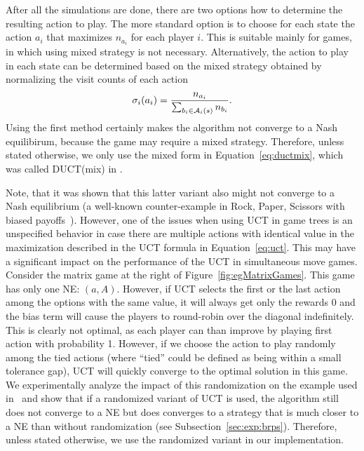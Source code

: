 After all the simulations are done, there are two options how to determine the resulting action to play.
The more standard option is to choose for each state the action $a_i$ that maximizes $n_{a_i}$ for each player $i$.
This is suitable mainly for games, in which using mixed strategy is not necessary.
Alternatively, the action to play in each state can be determined based on the mixed strategy obtained by normalizing the visit counts of each action
\begin{equation}
\sigma_i(a_i) = \frac{n_{a_i}}{\sum_{b_i\in \mathcal{A}_i(s)} n_{b_i}}.
\label{eq:ductmix}
\end{equation}
Using the first method certainly makes the algorithm not converge to a Nash equilibirum, because the game may require a mixed strategy.
Therefore, unless stated otherwise, we only use the mixed form in Equation~\ref{eq:ductmix}, which was called DUCT(mix) in 
\cite{Lanctot13Goofspiel,Tak14smmcts}. %

Note, that it was shown that this latter variant also might not converge to a Nash equilibrium (a well-known counter-example in Rock, Paper, Scissors with biased payoffs~\cite{Shafiei09}).
However, one of the issues when using UCT in game trees is an unspecified behavior in case there are multiple actions with identical value in the maximization described in the UCT formula in Equation~\ref{eq:uct}.
This may have a significant impact on the performance of the UCT in simultaneous move games.
Consider the matrix game at the right of Figure~\ref{fig:egMatrixGames}.
This game has only one NE: $(a,A)$. However, if UCT selects the first or the last action among the options with the same value, it will always get only the rewards 0 and the bias term will cause the players to round-robin over the diagonal indefinitely. This is clearly not optimal, as each player can than improve by playing first action with probability 1. However, if we choose the action to play randomly among the tied actions (where ``tied'' could be defined as being within a small tolerance gap), UCT will quickly converge to the optimal solution in this game.
We experimentally analyze the impact of this randomization on the example used in~\cite{Shafiei09} and show that if a randomized variant of UCT is used, the algorithm still does not converge to a NE but does converges to a strategy that is much closer to a NE than without randomization (see Subsection~\ref{sec:exp:brps}).
Therefore, unless stated otherwise, we use the randomized variant in our implementation.

